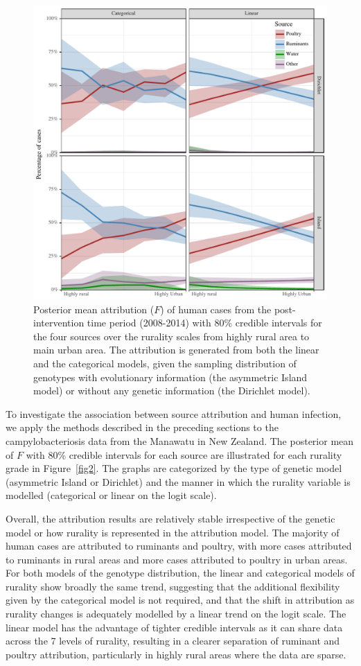 \documentclass[times, doublespace]{simauth}%
\begin{document}
\begin{figure}
\centering
\includegraphics[width=.8\linewidth]{Figures/attr_2009.pdf}
\caption{Posterior mean attribution ($F$) of human cases from the post-intervention time period (2008-2014) with 80\% credible intervals for the four sources over the rurality scales from highly rural area to main urban area. The attribution is generated from both the linear and the categorical models, given the sampling distribution of genotypes with evolutionary information (the asymmetric Island model) or without any genetic information (the Dirichlet model).}
\label{fig3}
\end{figure}

To investigate the association between source attribution and human infection, we apply the methods described in the preceding sections to the campylobacteriosis data from the Manawatu in New Zealand. The posterior mean of $F$ with 80\% credible intervals for each source are illustrated for each rurality grade in Figure~\ref{fig2}. The graphs are categorized by the type of genetic model (asymmetric Island or Dirichlet) and the manner in which the rurality variable is modelled (categorical or linear on the logit scale).

Overall, the attribution results are relatively stable irrespective of the genetic model or how rurality is represented in the attribution model. The majority of human cases are attributed to ruminants and poultry, with more cases attributed to ruminants in rural areas and more cases attributed to poultry in urban areas. For both models of the genotype distribution, the linear and categorical models of rurality show broadly the same trend, suggesting that the additional flexibility given by the categorical model is not required, and that the shift in attribution as rurality changes is adequately modelled by a linear trend on the logit scale. The linear model has the advantage of tighter credible intervals as it can share data across the 7 levels of rurality, resulting in a clearer separation of ruminant and poultry attribution, particularly in highly rural areas where the data are sparse.
\end{document}
